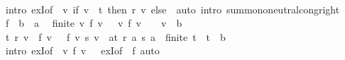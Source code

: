 \begin{isabellebody}
\ \ \ \ \isamarkupfalse%
\ {\isacharparenleft}{\kern0pt}intro\ exI{\isacharbrackleft}{\kern0pt}of\ {\isacharunderscore}{\kern0pt}\ {\isachardoublequoteopen}{\isasymlambda}v{\isachardot}{\kern0pt}\ if\ v\ {\isasymin}\ t\ then\ r\ v\ else\ {}{\isachardoublequoteclose}{\isacharbrackright}{\kern0pt}{\isacharparenright}{\kern0pt}\ {\isacharparenleft}{\kern0pt}auto\ intro{\isacharbang}{\kern0pt}{\isacharcolon}{\kern0pt}\ sum{\isachardot}{\kern0pt}mono{\isacharunderscore}{\kern0pt}neutral{\isacharunderscore}{\kern0pt}cong{\isacharunderscore}{\kern0pt}right{\isacharparenright}{\kern0pt}\isanewline
{}\isamarkupfalse%
\isanewline
\ \ \isamarkupfalse%
\ f\ {\isacharcolon}{\kern0pt}{\isacharcolon}{\kern0pt}\ {\isachardoublequoteopen}{\isacharprime}{\kern0pt}b\ {\isasymRightarrow}\ {\isacharprime}{\kern0pt}a{\isachardoublequoteclose}\ \isamarkupfalse%
\ {\isachardoublequoteopen}finite\ {\isacharbraceleft}{\kern0pt}v{\isachardot}{\kern0pt}\ f\ v\ {\isasymnoteq}\ {}{\isacharbraceright}{\kern0pt}{\isachardoublequoteclose}\ {\isachardoublequoteopen}{\isacharparenleft}{\kern0pt}{\isasymforall}v{\isachardot}{\kern0pt}\ f\ v\ {\isasymnoteq}\ {}\ {\isasymlongrightarrow}\ v\ {\isasymin}\ b{\isacharparenright}{\kern0pt}{\isachardoublequoteclose}\isanewline
\ \ \isamarkupfalse%
\ \isamarkupfalse%
\ {\isachardoublequoteopen}{\isasymexists}t\ r{\isachardot}{\kern0pt}\ {\isacharparenleft}{\kern0pt}{\isasymSum}v\ {\isacharbar}{\kern0pt}\ f\ v\ {\isasymnoteq}\ {}{\isachardot}{\kern0pt}\ f\ v\ {\isacharasterisk}{\kern0pt}s\ v{\isacharparenright}{\kern0pt}\ {\isacharequal}{\kern0pt}\ {\isacharparenleft}{\kern0pt}{\isasymSum}a{\isasymin}t{\isachardot}{\kern0pt}\ r\ a\ {\isacharasterisk}{\kern0pt}s\ a{\isacharparenright}{\kern0pt}\ {\isasymand}\ finite\ t\ {\isasymand}\ t\ {\isasymsubseteq}\ b{\isachardoublequoteclose}\isanewline
\ \ \ \ \isamarkupfalse%
\ {\isacharparenleft}{\kern0pt}intro\ exI{\isacharbrackleft}{\kern0pt}of\ {\isacharunderscore}{\kern0pt}\ {\isachardoublequoteopen}{\isacharbraceleft}{\kern0pt}v{\isachardot}{\kern0pt}\ f\ v\ {\isasymnoteq}\ {}{\isacharbraceright}{\kern0pt}{\isachardoublequoteclose}{\isacharbrackright}{\kern0pt}\ exI{\isacharbrackleft}{\kern0pt}of\ {\isacharunderscore}{\kern0pt}\ f{\isacharbrackright}{\kern0pt}{\isacharparenright}{\kern0pt}\ auto\isanewline
{}\isamarkupfalse%
%
\endisatagproof
{\isafoldproof}%
%
\isadelimproof
\isanewline
%
\endisadelimproof
\isanewline

\end{isabellebody}
